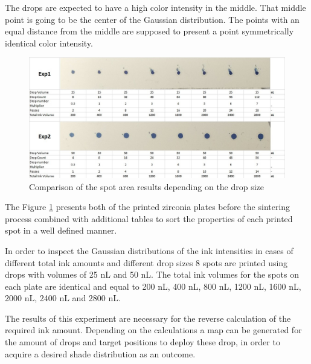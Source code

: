The drops are expected to have a high color intensity in the middle. That middle point is going to be the center of the Gaussian distribution. The points with an equal distance from the middle are supposed to present a point symmetrically identical color intensity.

\bigskip

\begin{figure}[H]
	\centering
	\includegraphics[width=1\textwidth]{grafiken/psfprint.jpg}
	\caption{Comparison of the spot area results depending on the drop size}
	\label{fig:psfprint}
\end{figure} 

\bigskip

The Figure \ref{fig:psfprint} presents both of the printed zirconia plates before the sintering process combined with additional tables to sort the properties of each printed spot in a well defined manner. 

In order to inspect the Gaussian distributions of the ink intensities in cases of different total ink amounts and different drop sizes 8 spots are printed using drops with volumes of 25 nL and 50 nL. The total ink volumes for the spots on each plate are identical and equal to 200 nL, 400 nL, 800 nL, 1200 nL, 1600 nL, 2000 nL, 2400 nL and 2800 nL.

The results of this experiment are necessary for the reverse calculation of the required ink amount. Depending on the calculations a map can be generated for the amount of drops and target positions to deploy these drop, in order to acquire a desired shade distribution as an outcome.  

